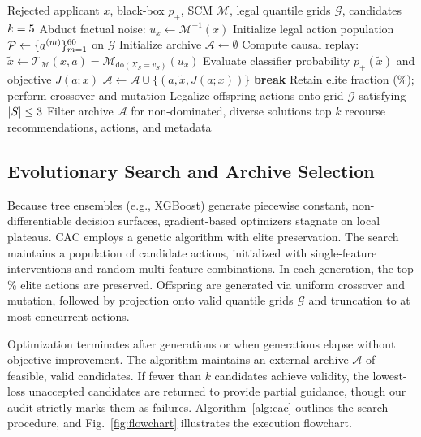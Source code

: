 \documentclass[nolineno]{paper/ieee-access/ieeeaccess}%
\newcommand{\CAC}{CAC}
\newcommand{\SCM}{\ensuremath{\mathcal{M}}}
\newcommand{\Replay}{\ensuremath{\mathcal{T}_{\SCM}}}
\begin{document}
\begin{algorithm}[t]
\caption{Evolutionary Causal Action Search (\CAC{})}
\label{alg:cac}
\begin{algorithmic}[1]
\Require Rejected applicant $x$, black-box $p_+$, SCM $\SCM$, legal quantile grids $\mathcal{G}$, candidates $k=5$
\State Abduct factual noise: $u_x \leftarrow \SCM^{-1}(x)$
\State Initialize legal action population $\mathcal{P} \leftarrow \{a^{(m)}\}_{m=1}^{60}$ on $\mathcal{G}$
\State Initialize archive $\mathcal{A} \leftarrow \emptyset$
    \State Compute causal replay: $\widetilde{x} \leftarrow \Replay(x, a) = \SCM_{\mathrm{do}(X_S=v_S)}(u_x)$
    \State Evaluate classifier probability $p_+(\widetilde{x})$ and objective $J(a; x)$
      \State $\mathcal{A} \leftarrow \mathcal{A} \cup \{(a, \widetilde{x}, J(a; x))\}$
    \EndIf
  \EndFor
    \State \textbf{break}
  \EndIf
  \State Retain elite fraction (\ElitePercent\%); perform crossover and mutation
  \State Legalize offspring actions onto grid $\mathcal{G}$ satisfying $|S| \le 3$
\EndFor
\State Filter archive $\mathcal{A}$ for non-dominated, diverse solutions
\State \Return top $k$ recourse recommendations, actions, and metadata
\end{algorithmic}
\end{algorithm}

\subsection{Evolutionary Search and Archive Selection}
Because tree ensembles (e.g., XGBoost) generate piecewise constant, non-differentiable decision surfaces, gradient-based optimizers stagnate on local plateaus. \CAC{} employs a genetic algorithm with elite preservation. The search maintains a population of \PopulationSize{} candidate actions, initialized with single-feature interventions and random multi-feature combinations. In each generation, the top \ElitePercent\% elite actions are preserved. Offspring are generated via uniform crossover and mutation, followed by projection onto valid quantile grids $\mathcal{G}$ and truncation to at most \MaxActions{} concurrent actions.

Optimization terminates after \MaxGenerations{} generations or when \SearchPatience{} generations elapse without objective improvement. The algorithm maintains an external archive $\mathcal{A}$ of feasible, valid candidates. If fewer than $k$ candidates achieve validity, the lowest-loss unaccepted candidates are returned to provide partial guidance, though our audit strictly marks them as failures. Algorithm~\ref{alg:cac} outlines the search procedure, and Fig.~\ref{fig:flowchart} illustrates the execution flowchart.
\end{document}
